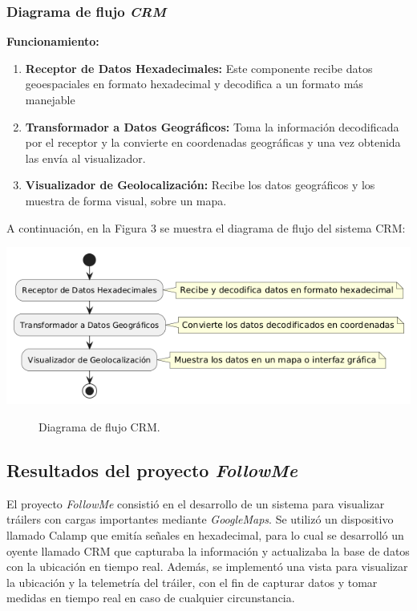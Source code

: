 \documentclass[protocolo.tex]{subfiles}
\begin{document}
\subsubsection{Diagrama de flujo \textit{CRM}} 
\textbf{Funcionamiento:}
\begin{enumerate}
    \item \textbf{Receptor de Datos Hexadecimales:}  
    Este componente recibe datos geoespaciales en formato hexadecimal y decodifica a un formato más manejable
    \item \textbf{Transformador a Datos Geográficos:}  
    Toma la información decodificada por el receptor y la convierte en coordenadas geográficas y una vez obtenida las envía al visualizador.
    \item \textbf{Visualizador de Geolocalización:}  
    Recibe los datos geográficos y los muestra de forma visual, sobre un mapa.
\end{enumerate}
A continuación, en la Figura 3 se muestra el diagrama de flujo del sistema CRM:\vspace{4mm}
\begin{center}
\includegraphics[scale=0.6]{Imagenes/pdf/crmF.png}
\end{center}
\begin{figure}[h]  %
    \centering
    \caption{Diagrama de flujo CRM.}
    \label{fig:mi-figura3}
\end{figure}

\subsection{Resultados del proyecto \textit{FollowMe}}

El proyecto \textit{FollowMe} consistió en el desarrollo de un sistema para visualizar tráilers con cargas importantes mediante \textit{GoogleMaps}.  Se utilizó un dispositivo llamado Calamp que emitía señales en hexadecimal, para lo cual se desarrolló un oyente llamado CRM que capturaba la información y  actualizaba la base de datos con la ubicación en tiempo real.  Además, se implementó una vista para visualizar la ubicación y la telemetría del tráiler, con el fin de capturar datos y tomar medidas en tiempo real en caso de cualquier circunstancia.\vspace{4mm}
\end{document}
